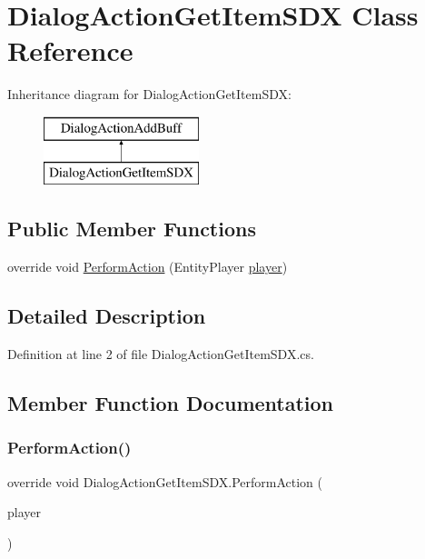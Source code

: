 \hypertarget{class_dialog_action_get_item_s_d_x}{}\section{Dialog\+Action\+Get\+Item\+S\+DX Class Reference}
\label{class_dialog_action_get_item_s_d_x}
Inheritance diagram for Dialog\+Action\+Get\+Item\+S\+DX\+:\begin{figure}[H]
\begin{center}
\leavevmode
\includegraphics[height=2.000000cm]{class_dialog_action_get_item_s_d_x}
\end{center}
\end{figure}
\subsection*{Public Member Functions}
\begin{DoxyCompactItemize}
\item 
override void \mbox{\hyperlink{class_dialog_action_get_item_s_d_x_a838e83a5b2d3723df1aeafb3367b0175}{Perform\+Action}} (Entity\+Player \mbox{\hyperlink{_sphere_i_i_01_music_01_boxes_2_config_2_localization_8txt_a4e2cb8aeff651600ea1cc57fe5a929a4}{player}})
\end{DoxyCompactItemize}


\subsection{Detailed Description}


Definition at line 2 of file Dialog\+Action\+Get\+Item\+S\+D\+X.\+cs.



\subsection{Member Function Documentation}
\mbox{\label{class_dialog_action_get_item_s_d_x_a838e83a5b2d3723df1aeafb3367b0175}} 
\subsubsection{\texorpdfstring{PerformAction()}{PerformAction()}}
{\footnotesize\ttfamily override void Dialog\+Action\+Get\+Item\+S\+D\+X.\+Perform\+Action (\begin{DoxyParamCaption}\item[{Entity\+Player}]{player }\end{DoxyParamCaption})}



